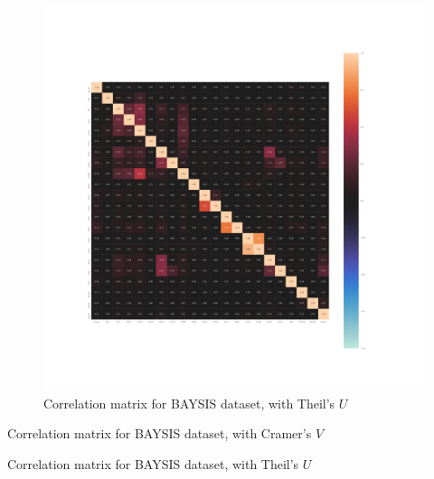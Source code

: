 \documentclass[a4paper,headsepline,footsepline,fontsize=11pt,BCOR=12mm,DIV=12]{report}
\begin{document}
\begin{appendices}
\begin{figure}[h]
	\centering
	\includegraphics[scale=0.4, trim=2cm 6cm 0cm 6cm]{../CorrAnalysis/data/BAYSIS/01_dataset/plots/baysis_dataset_corr_theils}
	\caption{Correlation matrix for BAYSIS dataset, with Theil's $U$}
	\label{img:appendix_correlation_matrix_dataset_theils}
\end{figure}
\restoregeometry


\begin{table}
\tiny
\setlength{\tabcolsep}{4pt}
\centering

\caption{Correlation matrix for BAYSIS dataset, with Cramer's $V$}
\label{table:appendix_correlation_matrix_dataset_cramers}
\end{table}

\begin{table}
\tiny
\setlength{\tabcolsep}{4pt}
\centering

\caption{Correlation matrix for BAYSIS dataset, with Theil's $U$}
\label{table:appendix_correlation_matrix_dataset_theils}
\end{table}


\end{appendices}
\end{document}
